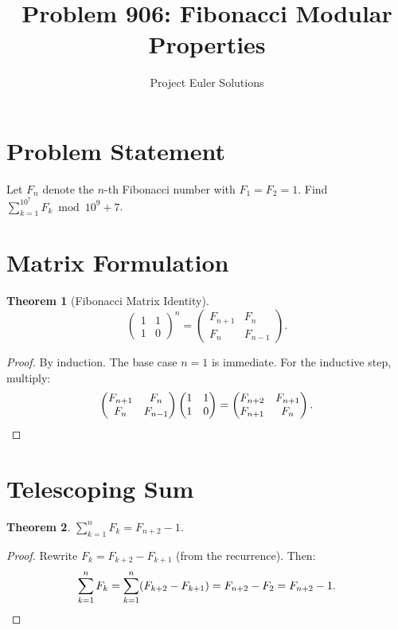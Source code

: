 \documentclass[11pt]{article}
\title{Problem 906: Fibonacci Modular Properties}
\author{Project Euler Solutions}
\date{}
\newtheorem{theorem}{Theorem}
\begin{document}
\maketitle

\section{Problem Statement}

Let $F_n$ denote the $n$-th Fibonacci number with $F_1 = F_2 = 1$. Find $\sum_{k=1}^{10^7} F_k \bmod 10^9+7$.

\section{Matrix Formulation}

\begin{theorem}[Fibonacci Matrix Identity]
\[
\begin{pmatrix} 1 & 1 \\ 1 & 0 \end{pmatrix}^n = \begin{pmatrix} F_{n+1} & F_n \\ F_n & F_{n-1} \end{pmatrix}.
\]
\end{theorem}

\begin{proof}
By induction. The base case $n=1$ is immediate. For the inductive step, multiply:
\[
\begin{pmatrix} F_{n+1} & F_n \\ F_n & F_{n-1} \end{pmatrix} \begin{pmatrix} 1 & 1 \\ 1 & 0 \end{pmatrix} = \begin{pmatrix} F_{n+2} & F_{n+1} \\ F_{n+1} & F_n \end{pmatrix}. \qedhere
\]
\end{proof}

\section{Telescoping Sum}

\begin{theorem}
\label{thm:telescope}
$\displaystyle\sum_{k=1}^{n} F_k = F_{n+2} - 1$.
\end{theorem}

\begin{proof}
Rewrite $F_k = F_{k+2} - F_{k+1}$ (from the recurrence). Then:
\[
\sum_{k=1}^{n} F_k = \sum_{k=1}^{n}(F_{k+2} - F_{k+1}) = F_{n+2} - F_2 = F_{n+2} - 1. \qedhere
\]
\end{proof}
\end{document}
